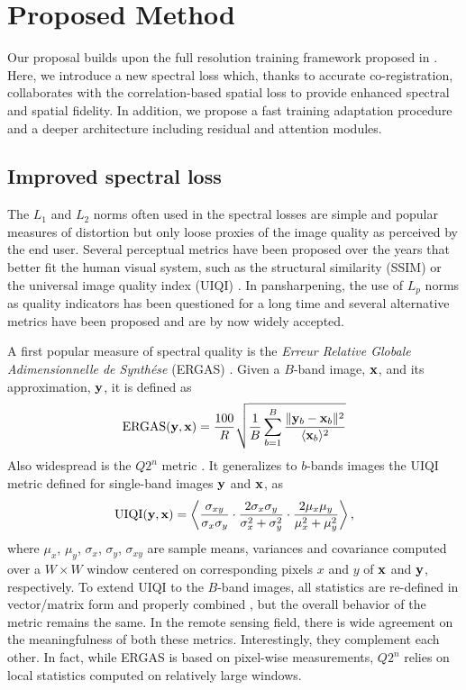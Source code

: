 \documentclass[journal]{IEEEtran}
\begin{document}
\section{Proposed Method}
\label{sec:proposed}

Our proposal builds upon the full resolution training framework proposed in \cite{Ciotola2022}.
Here, we introduce a new spectral loss which, thanks to accurate co-registration,
collaborates with the correlation-based spatial loss to provide enhanced spectral and spatial fidelity.
In addition, we propose a fast training adaptation procedure and a deeper architecture including residual and attention modules.

\subsection{Improved spectral loss}

The $L_1$ and $L_2$ norms often used in the spectral losses are simple and popular measures of distortion
but only loose proxies of the image quality as perceived by the end user.
Several perceptual metrics have been proposed over the years that better fit the human visual system,
such as the structural similarity (SSIM) \cite{Wang2004} or the universal image quality index (UIQI) \cite{Wang2002}.
In pansharpening, the use of $L_p$ norms as quality indicators has been questioned for a long time
and several alternative metrics have been proposed and are by now widely accepted.

\newcommand{\x}{{\bf x}}
\newcommand{\y}{{\bf y}}
A first popular measure of spectral quality is the {\em Erreur Relative Globale Adimensionnelle de Synth{\'e}se} (ERGAS) \cite{Wald2002}.
Given a $B$-band image, $\x$, and its approximation, $\y$, it is defined as
\begin{equation}
    {\rm ERGAS}(\y,\x) = \frac{100}{R} \sqrt{\frac{1}{B}\sum_{b=1}^B \frac{\|\y_b-\x_b\|^2}{\langle \x_b \rangle^2}}
\end{equation}
Also widespread is the $Q2^n$ metric \cite{Garzelli2009}.
It generalizes to $b$-bands images the UIQI metric defined for single-band images $\y$ and $\x$, as
\begin{equation}
    {\rm UIQI}(\y,\x) = \left\langle
                        \frac{\sigma_{xy}}{\sigma_x \sigma_y} \cdot
                        \frac{2\sigma_x\sigma_y}{\sigma_x^2 + \sigma_y^2} \cdot
                        \frac{2\mu_x \mu_y}{\mu_x^2 + \mu_y^2}
                        \right\rangle ,
\end{equation}
where $\mu_x$, $\mu_y$, $\sigma_x$, $\sigma_y$, $\sigma_{xy}$ are sample means, variances and covariance
computed over a $W\times W$ window centered on corresponding pixels $x$ and $y$ of $\x$ and $\y$, respectively.
To extend UIQI to the $B$-band images, all statistics are re-defined in vector/matrix form and properly combined \cite{Garzelli2009},
but the overall behavior of the metric remains the same.
In the remote sensing field, there is wide agreement on the meaningfulness of both these metrics.
Interestingly, they complement each other.
In fact, while ERGAS is based on pixel-wise measurements, $Q2^n$ relies on local statistics computed on relatively large windows.
\end{document}
